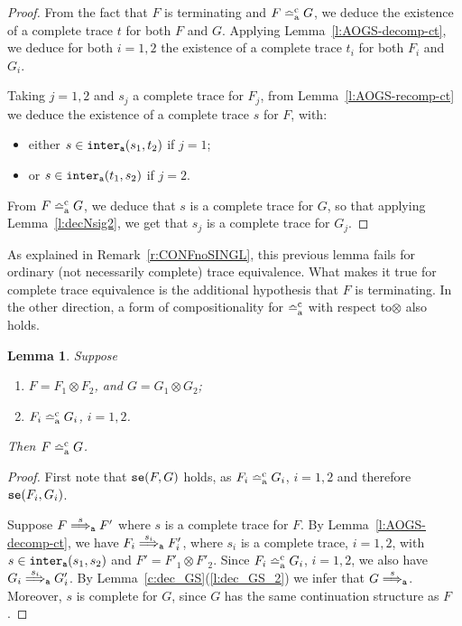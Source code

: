 \documentclass[11pt,a4paper]{amsart}
\theoremstyle{plain}
\theoremstyle{definition}
\theoremstyle{defC}
\theoremstyle{thmC}
\theoremstyle{plain}
\numberwithin{equation}{section}
\newcommand{\wrt}{with respect to\xspace}  %
\newcommand{\tr}{s}
\newcommand{\appendCon}[2]{#1 \otimes #2}
\newcommand{\okC}[2]{{\tt se}(#1,#2)}  %
\newcommand{\rmm}[1]{{\tt{\lowercase{#1}}}}
\newcommand{\genArr}[2]{\mathrel{\stackrel{{#1}}{\Longrightarrow}_{\rmm{\lowercase{#2}}}}}  %
\newcommand{\ArrA}[1]{\genArr{#1}{A}}  %
\newcommand{\genTEcomp}[1]{\mathrel{\bumpeq^{\rm c}_{\rm{\lowercase{#1}}}}} %
\newcommand{\TEc}{\genTEcomp{A}}        %
\newcommand{\interlA}[2]{{\tt inter_{a}}( #1, #2)}
\newcommand{\FF}{F}
\newcommand{\GG}{G}
\theoremstyle{plain}
\newtheorem{lemma}[thm]{Lemma}
\theoremstyle{definition}
\begin{document}
\begin{proof}
  From the fact that $\FF$ is terminating and 
  $\FF \TEc \GG$, we deduce the existence of 
  a complete trace $t$ for both $\FF$ and $\GG$.
  Applying Lemma~\ref{l:AOGS-decomp-ct},
  we deduce for both $i=1,2$ the existence of a complete trace $t_i$
  for both $\FF_i$ and $\GG_i$. 
 
  Taking $j=1,2$ and $\tr_j$ a complete trace for $\FF_j$,
  from Lemma~\ref{l:AOGS-recomp-ct}
  we deduce the existence of a complete trace $\tr$ for $\FF$, with:
  \begin{itemize}
    \item either $\tr \in \interlA{\tr_1}{t_2}$ if $j=1$;
    \item or $\tr \in \interlA{t_1}{\tr_2}$ if $j=2$.
  \end{itemize}
  From $\FF  \TEc \GG$, we deduce that $\tr$ is a complete trace for $\GG$,
  so that applying Lemma~\ref{l:decNsig2},
  we get that $\tr_j$ is a complete trace for $\GG_j$.
\end{proof}
\noindent
As explained in Remark~\ref{r:CONFnoSINGL}, 
this previous lemma fails for ordinary (not necessarily complete) trace equivalence.
What makes it true for complete trace equivalence is the additional hypothesis
that $\FF$ is terminating.
%
In the other direction, a form of compositionality  
for $\TEc$ \wrt $\otimes$ also holds.

\begin{lemma}
\label{l:compCN}
Suppose 
\begin{enumerate}
\item 
$\FF = \appendCon{\FF_1}{\FF_2}$,   
 and  
$\GG = \appendCon{\GG_1}{\GG_2}$;
\item 
${\FF_i}  \TEc {\GG_i}$, $i=1,2$. 
\end{enumerate} 
Then 
${\FF} \TEc {\GG}$.
\end{lemma}              


\begin{proof}
First note that $\okC{\FF}{\GG}$ holds, 
as ${\FF_i}  \TEc {\GG_i}$, $i=1,2$ and therefore 
$\okC{{\FF_i}}{{\GG_i}}$. 

Suppose $\FF \ArrA \tr \FF'$ where $\tr$ is a complete trace for $\FF$. 
By Lemma~\ref{l:AOGS-decomp-ct}, we have 
${\FF_i} \ArrA{\tr_i} \FF_i'$,
where $ \tr_i$ is a complete trace, $i=1,2$,
with $\tr \in \interlA{\tr_1}{\tr_2} $ and  
$\FF' = \appendCon{\FF'_1}{\FF'_2}$.
%
Since ${\FF_i}  \TEc {\GG_i}$, $i=1,2$, we also have  
${\GG_i} \ArrA{\tr_i}   \GG_i'$. 
By Lemma~\ref{c:dec_GS}(\ref{l:dec_GS_2}) we infer that 
$\GG \ArrA{\tr}$. Moreover, $\tr$ is complete for $\GG$,
since $\GG$ has the same continuation structure as $\FF$.
\end{proof}  
\end{document}
